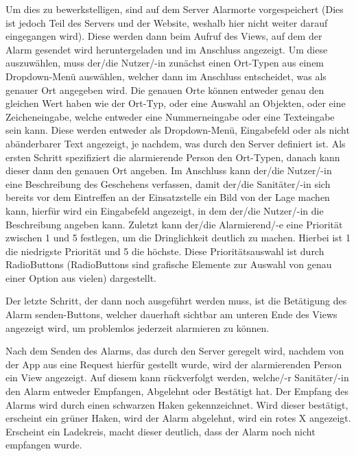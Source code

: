      \noindent Um dies zu bewerkstelligen, sind auf dem Server Alarmorte vorgespeichert (Dies ist
     jedoch Teil des Servers und der Website, weshalb hier nicht weiter darauf eingegangen wird).
     Diese werden dann beim Aufruf des Views, auf dem der Alarm gesendet wird 
     heruntergeladen und im Anschluss angezeigt. Um diese auszuwählen, muss der/die 
     Nutzer/-in zunächst einen Ort-Typen aus einem Dropdown-Menü auswählen, welcher
     dann im Anschluss entscheidet, was als genauer Ort angegeben wird. Die genauen 
     Orte können entweder genau den gleichen Wert haben wie der Ort-Typ, oder eine 
     Auswahl an Objekten, oder eine Zeicheneingabe, welche entweder eine 
     Nummerneingabe oder eine Texteingabe sein kann. Diese werden entweder als 
     Dropdown-Menü, Eingabefeld oder als nicht abänderbarer Text angezeigt, je nachdem, was durch den Server definiert ist.
     Als ersten Schritt spezifiziert die alarmierende Person den Ort-Typen, danach 
     kann dieser dann den genauen Ort angeben. Im Anschluss kann der/die 
     Nutzer/-in eine Beschreibung des Geschehens verfassen, damit der/die 
     Sanitäter/-in sich bereits vor dem Eintreffen an der Einsatzstelle ein Bild von 
     der Lage machen kann, hierfür wird ein Eingabefeld angezeigt, in dem 
     der/die Nutzer/-in die Beschreibung angeben kann. Zuletzt kann der/die 
     Alarmierend/-e eine Priorität zwischen 1 und 5 festlegen, um die Dringlichkeit 
     deutlich zu machen. Hierbei ist 1 die niedrigste Priorität und 5 die höchste. Diese 
     Prioritätsauswahl ist durch RadioButtons (RadioButtons sind grafische Elemente zur Auswahl von genau einer 
     Option aus vielen) dargestellt.

    \noindent Der letzte Schritt, der dann noch ausgeführt werden muss, ist die 
    Betätigung des \glqq Alarm senden\grqq-Buttons, welcher dauerhaft sichtbar am 
    unteren Ende des Views angezeigt wird, um problemlos jederzeit alarmieren zu 
    können.

    Nach dem Senden des Alarms, das durch den Server geregelt wird, 
    nachdem von der App aus eine Request hierfür gestellt wurde, wird der 
    alarmierenden Person ein View angezeigt. Auf diesem kann rückverfolgt werden, 
    welche/-r Sanitäter/-in den Alarm entweder \glqq Empfangen\grqq{}, \glqq Abgelehnt\grqq{} 
    oder \glqq Bestätigt\grqq{} hat.
    Der Empfang des Alarms wird durch einen schwarzen Haken gekennzeichnet. Wird dieser bestätigt, erscheint ein
    grüner Haken, wird der Alarm abgelehnt, wird ein rotes X angezeigt. Erscheint ein Ladekreis, macht dieser deutlich,
    dass der Alarm noch nicht empfangen wurde.\\

